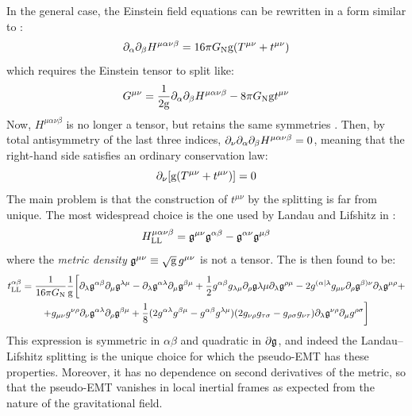 In the general case, the Einstein field equations can be rewritten in a form similar to :
\begin{equation}
  \partial_\alpha \partial_\beta H^{\mu \alpha \nu \beta} = 16 \pi G_\text{N} \mathrm{g} (T^{\mu \nu} + t^{\mu \nu})
\end{equation}
which requires the Einstein tensor to split like:
\begin{equation}
  G^{\mu \nu} = \frac{1}{2 \mathrm{g}} \partial_\alpha \partial_\beta H^{\mu \alpha \nu \beta} - 8 \pi G_\text{N} \mathrm{g} t^{\mu \nu}
  \label{eq:ll-splitting}
\end{equation}
Now, $ H^{\mu \alpha \nu \beta} $ is no longer a tensor, but retains the same symmetries . Then, by total antisymmetry of the last three indices, $ \partial_\nu \partial_\alpha \partial_\beta H^{\mu \alpha \nu \beta} = 0 $, meaning that the right-hand side satisfies an ordinary conservation law:
\begin{equation}
  \partial_\nu [\mathrm{g} (T^{\mu \nu} + t^{\mu \nu})] = 0
  \label{eq:pseudo-emt-cons}
\end{equation}
The main problem is that the construction of $ t^{\mu \nu} $ by the splitting  is far from unique. The most widespread choice is the one used by Landau and Lifshitz in \cite{landau-2}:
\begin{equation}
  H_\text{LL}^{\mu \alpha \nu \beta} = \mathfrak{g}^{\mu \nu} \mathfrak{g}^{\alpha \beta} - \mathfrak{g}^{\alpha \nu} \mathfrak{g}^{\mu \beta}
  \label{eq:ll-split}
\end{equation}
where  the \emph{metric density} $ \mathfrak{g}^{\mu \nu} \equiv \sqrt{\mathrm{g}} \, g^{\mu \nu} $ is not a tensor. The  is then found to be:
\begin{multline}
  t_\text{LL}^{\alpha \beta} = \frac{1}{16 \pi G_\text{N}} \frac{1}{\mathrm{g}} \bigg[ \partial_\lambda \mathfrak{g}^{\alpha \beta} \partial_\mu \mathfrak{g}^{\lambda \mu} - \partial_\lambda \mathfrak{g}^{\alpha \lambda} \partial_\mu \mathfrak{g}^{\beta \mu} + \frac{1}{2} g^{\alpha \beta} g_{\lambda \mu} \partial_\rho \mathfrak{g}{\lambda \mu} \partial_\lambda \mathfrak{g}^{\rho \mu} - 2 g^{(\alpha | \lambda} g_{\mu \nu} \partial_\rho \mathfrak{g}^{\beta) \nu} \partial_\lambda \mathfrak{g}^{\mu \rho} + \\
  + g_{\mu \nu} g^{\nu \rho} \partial_\nu \mathfrak{g}^{\alpha \lambda} \partial_\rho \mathfrak{g}^{\beta \mu} + \frac{1}{8} (2 g^{\alpha \lambda} g^{\beta \mu} - g^{\alpha \beta} g^{\lambda \mu}) (2 g_{\nu \rho} g_{\tau \sigma} - g_{\rho \sigma} g_{\nu \tau}) \partial_\lambda \mathfrak{g}^{\nu \rho} \partial_\mu g^{\rho \sigma} \bigg]
\end{multline}
This expression is symmetric in $ \alpha \beta $ and quadratic in $ \partial \mathfrak{g} $, and indeed the Landau--Lifshitz splitting is the unique choice for which the pseudo-EMT has these properties. Moreover, it has no dependence on second derivatives of the metric, so that the pseudo-EMT vanishes in local inertial frames as expected from the nature of the gravitational field.


